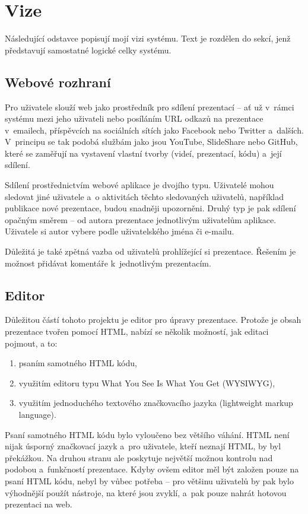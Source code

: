 \documentclass[11pt,twoside,a4paper]{book}
\newcommand*{\nomExpl}[2]{#2 (#1)\nomenclature{#1}{#2}} 	%
\begin{document}
\section{Vize}
Následující odstavce popisují mojí vizi systému. Text je rozdělen do sekcí, jenž představují samostatné logické celky systému.

\subsection{Webové rozhraní}
Pro uživatele slouží web jako prostředník pro sdílení prezentací – ať už v~rámci systému mezi jeho uživateli nebo
posíláním URL odkazů na prezentace v~emailech, příspěvcích na sociálních sítích jako Facebook nebo Twitter a~dalších. V~principu se tak podobá službám jako jsou YouTube, SlideShare nebo GitHub, které se zaměřují na vystavení vlastní tvorby (videí, prezentací, kódu) a~její sdílení.

Sdílení prostřednictvím webové aplikace je dvojího typu. Uživatelé mohou sledovat jiné uživatele a~o aktivitách těchto sledovaných uživatelů, například publikace nové prezentace, budou snadněji upozorněni. Druhý typ je pak sdílení opačným směrem – od autora prezentace jednotlivým uživatelům aplikace. Uživatele si autor vybere podle uživatelského jména či \mbox{e-mailu}.

Důležitá je také zpětná vazba od uživatelů prohlížející si prezentace. Řešením je možnost přidávat komentáře k~jednotlivým prezentacím.

\subsection{Editor}
Důležitou částí tohoto projektu je editor pro úpravy prezentace. Protože je obsah prezentace tvořen pomocí HTML, nabízí se
několik možností, jak editaci pojmout, a to:

\begin{enumerate}
	\item psaním samotného HTML kódu,
	\item využitím editoru typu \nomExpl{WYSIWYG}{What You See Is What You Get},
	\item využitím jednoduchého textového značkovacího jazyka (lightweight markup language).
\end{enumerate}

Psaní samotného HTML kódu bylo vyloučeno bez většího váhání. HTML není nijak úsporný značkovací jazyk a~pro uživatele, kteří neznají HTML, by byl překážkou. Na druhou stranu ale poskytuje největší možnou kontrolu nad podobou a~funkčností prezentace. Kdyby ovšem editor měl být založen pouze na psaní HTML kódu, nebyl by vůbec potřeba – pro většinu uživatelů by pak bylo výhodnější použít nástroje, na které jsou zvyklí, a~pak pouze nahrát hotovou prezentaci na web.
\end{document}
